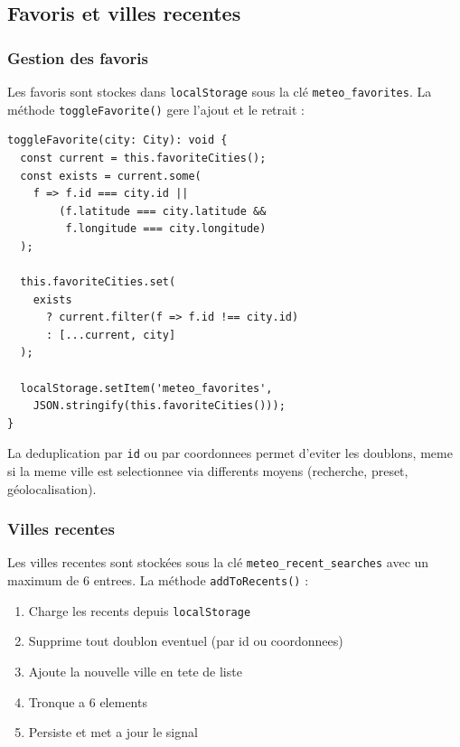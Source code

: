 \documentclass[12pt,a4paper]{article}
\begin{document}
\subsection{Favoris et villes recentes}

\subsubsection{Gestion des favoris}

Les favoris sont stockes dans \texttt{localStorage} sous la clé \texttt{meteo\_favorites}. La méthode \texttt{toggleFavorite()} gere l'ajout et le retrait :

\begin{lstlisting}[style=angular, caption={Ajout/retrait d'un favori avec persistance}]
toggleFavorite(city: City): void {
  const current = this.favoriteCities();
  const exists = current.some(
    f => f.id === city.id ||
        (f.latitude === city.latitude &&
         f.longitude === city.longitude)
  );

  this.favoriteCities.set(
    exists
      ? current.filter(f => f.id !== city.id)
      : [...current, city]
  );

  localStorage.setItem('meteo_favorites',
    JSON.stringify(this.favoriteCities()));
}
\end{lstlisting}

La deduplication par \texttt{id} ou par coordonnees permet d'eviter les doublons, meme si la meme ville est selectionnee via differents moyens (recherche, preset, géolocalisation).

\subsubsection{Villes recentes}

Les villes recentes sont stockées sous la clé \texttt{meteo\_recent\_searches} avec un maximum de 6 entrees. La méthode \texttt{addToRecents()} :

\begin{enumerate}[nosep]
    \item Charge les recents depuis \texttt{localStorage}
    \item Supprime tout doublon eventuel (par id ou coordonnees)
    \item Ajoute la nouvelle ville en tete de liste
    \item Tronque a 6 elements
    \item Persiste et met a jour le signal
\end{enumerate}
\end{document}
